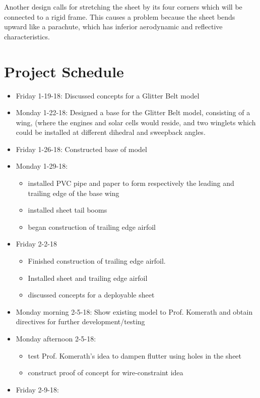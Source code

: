 \documentclass[12pt]{report} %
\begin{document}
Another design calls for stretching the sheet by its four corners which will be connected to a rigid frame.  This causes a problem because
the sheet bends upward like a parachute, which has inferior aerodynamic and reflective characteristics.

\chapter{Project Schedule}
\begin{itemize}
  \item Friday 1-19-18:  Discussed concepts for a Glitter Belt model
  \item Monday 1-22-18:  Designed a base for the Glitter Belt model, consisting of a wing, (where the engines and solar cells would
reside, and two winglets which could be installed at different dihedral and sweepback angles.
  \item Friday 1-26-18:  Constructed base of model
  \item Monday 1-29-18:
  \begin{itemize}
    \item installed PVC pipe and paper to form respectively the leading and trailing edge of the base wing
    \item installed sheet tail booms
    \item began construction of trailing edge airfoil
  \end{itemize}
  \item Friday 2-2-18
  \begin{itemize}
    \item Finished construction of trailing edge airfoil.
    \item Installed sheet and trailing edge airfoil
    \item discussed concepts for a deployable sheet
  \end{itemize}
  \item Monday morning 2-5-18:  Show existing model to Prof. Komerath and obtain directives for further development/testing
  \item Monday afternoon 2-5-18:
  \begin{itemize}
    \item test Prof. Komerath's idea to dampen flutter using holes in the sheet
    \item construct proof of concept for wire-constraint idea
  \end{itemize}
  \item Friday 2-9-18:
  \begin{itemize}

\end{itemize}
\end{itemize}
\end{document}
